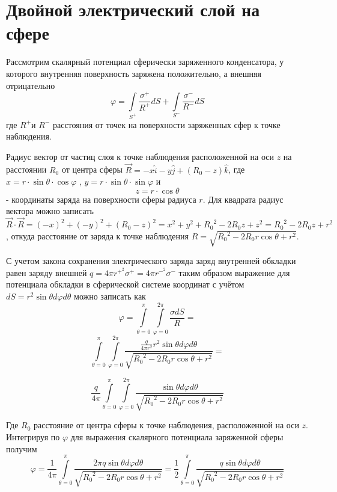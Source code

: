 \documentclass[12pt]{article}
\begin{document}
\section{Двойной электрический слой на сфере}

Рассмотрим скалярный потенциал сферически заряженного конденсатора, у которого внутренняя поверхность заряжена положительно, а внешняя отрицательно
	\[\varphi =\int\limits_{{{S}^{+}}}{\frac{{{\sigma }^{+}}}{{{R}^{+}}}dS+}\int\limits_{{{S}^{-}}}{\frac{{{\sigma }^{-}}}{{{R}^{-}}}dS}\] 	
где ${{R}^{+}}$и ${{R}^{-}}$ расстояния от точек на поверхности заряженных сфер к точке наблюдения.

Радиус вектор от частиц слоя к точке наблюдения расположенной на оси $z$ на расстоянии ${{R}_{0}}$ от центра сферы $\overrightarrow{R}=-x\widehat{i}-y\widehat{j}+\left( {{R}_{0}}-z \right)\widehat{k}$, где $x=r\cdot \sin \theta \cdot \cos \varphi $ , $y=r\cdot \sin \theta \cdot \sin \varphi $ и \[z=r\cdot \cos \theta \] - координаты заряда на поверхности сферы радиуса $r$. Для квадрата радиус вектора можно записать $\overrightarrow{R}\cdot \overrightarrow{R}={{\left( -x \right)}^{2}}+{{\left( -y \right)}^{2}}+{{\left( {{R}_{0}}-z \right)}^{2}}={{x}^{2}}+{{y}^{2}}+{{R}_{0}}^{2}-2{{R}_{0}}z+{{z}^{2}}={{R}_{0}}^{2}-2{{R}_{0}}z+{{r}^{2}}$, откуда расстояние от заряда к точке наблюдения $R=\sqrt{{{R}_{0}}^{2}-2{{R}_{0}}r\cos \theta +{{r}^{2}}}$.

С учетом закона сохранения электрического заряда заряд внутренней обкладки равен заряду внешней $q=4\pi {{r}^{{{+}^{2}}}}{{\sigma }^{+}}=4\pi {{r}^{{{-}^{2}}}}{{\sigma }^{-}}$ таким образом выражение для потенциала обкладки в сферической системе координат с учётом $dS={{r}^{2}}\sin \theta d\varphi d\theta $  можно записать как
	\[\varphi =\int\limits_{\theta =0}^{\pi }{\int\limits_{\varphi =0}^{2\pi }{\frac{\sigma dS}{R}}} = \]
 \[\int\limits_{\theta =0}^{\pi }{\int\limits_{\varphi =0}^{2\pi }{\frac{\frac{q}{4\pi {{r}^{2}}}{{r}^{2}}\sin \theta d\varphi d\theta }{\sqrt{{{R}_{0}}^{2}-2{{R}_{0}}r\cos \theta +{{r}^{2}}}}}} = \]

 \[\frac{q}{4\pi }\int\limits_{\theta =0}^{\pi }{\int\limits_{\varphi =0}^{2\pi }{\frac{\sin \theta d\varphi d\theta }{\sqrt{{{R}_{0}}^{2}-2{{R}_{0}}r\cos \theta +{{r}^{2}}}}}}\]

Где ${R}_{0}$ расстояние от центра сферы к точке наблюдения, расположенной на оси $z$. Интегрируя по $\varphi$ для выражения скалярного потенциала заряженной сферы получим
	\[\varphi =\frac{1}{4\pi }\int\limits_{\theta =0}^{\pi }{\frac{2\pi q\sin \theta d\varphi d\theta }{\sqrt{{{R}_{0}}^{2}-2{{R}_{0}}r\cos \theta +{{r}^{2}}}}}=\frac{1}{2}\int\limits_{\theta =0}^{\pi }{\frac{q\sin \theta d\varphi d\theta }{\sqrt{{{R}_{0}}^{2}-2{{R}_{0}}r\cos \theta +{{r}^{2}}}}}\] 	
\end{document}
